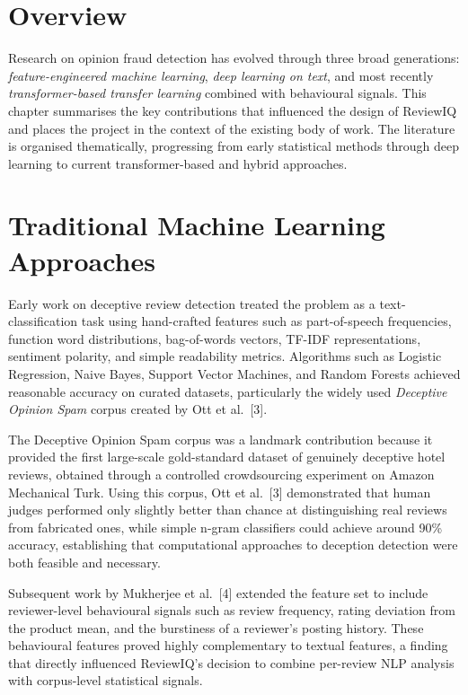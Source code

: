 \documentclass[12pt,a4paper,oneside]{report}
\begin{document}
\section{Overview}
Research on opinion fraud detection has evolved through three broad
generations: \emph{feature-engineered machine learning}, \emph{deep
learning on text}, and most recently \emph{transformer-based transfer
learning} combined with behavioural signals. This chapter summarises the
key contributions that influenced the design of ReviewIQ and places the
project in the context of the existing body of work. The literature is
organised thematically, progressing from early statistical methods through
deep learning to current transformer-based and hybrid approaches.

\section{Traditional Machine Learning Approaches}
Early work on deceptive review detection treated the problem as a
text-classification task using hand-crafted features such as part-of-speech
frequencies, function word distributions, bag-of-words vectors, TF-IDF
representations, sentiment polarity, and simple readability metrics.
Algorithms such as Logistic Regression, Naive Bayes, Support Vector
Machines, and Random Forests achieved reasonable accuracy on curated
datasets, particularly the widely used \textit{Deceptive Opinion Spam}
corpus created by Ott et al.~[3].

The Deceptive Opinion Spam corpus was a landmark contribution because it
provided the first large-scale gold-standard dataset of genuinely
deceptive hotel reviews, obtained through a controlled crowdsourcing
experiment on Amazon Mechanical Turk. Using this corpus, Ott et al.~[3]
demonstrated that human judges performed only slightly better than chance
at distinguishing real reviews from fabricated ones, while simple n-gram
classifiers could achieve around 90\% accuracy, establishing that
computational approaches to deception detection were both feasible and
necessary.

Subsequent work by Mukherjee et al.~[4] extended the feature set to
include reviewer-level behavioural signals such as review frequency, rating
deviation from the product mean, and the burstiness of a reviewer's
posting history. These behavioural features proved highly complementary to
textual features, a finding that directly influenced ReviewIQ's decision
to combine per-review NLP analysis with corpus-level statistical signals.
\end{document}
